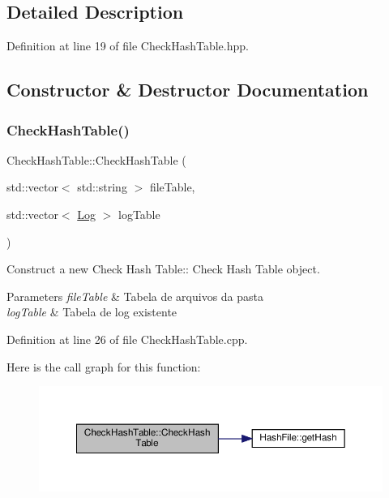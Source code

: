 \subsection{Detailed Description}


Definition at line 19 of file Check\+Hash\+Table.\+hpp.



\subsection{Constructor \& Destructor Documentation}
\mbox{\label{class_check_hash_table_a4e5be4b9a124cbf72c8f06d63e6ffca5}} 
\subsubsection{\texorpdfstring{Check\+Hash\+Table()}{CheckHashTable()}\hspace{0.1cm}{\footnotesize\ttfamily [1/2]}}
{\footnotesize\ttfamily Check\+Hash\+Table\+::\+Check\+Hash\+Table (\begin{DoxyParamCaption}\item[{std\+::vector$<$ std\+::string $>$}]{file\+Table,  }\item[{std\+::vector$<$ \hyperlink{class_log}{Log} $>$}]{log\+Table }\end{DoxyParamCaption})}



Construct a new Check Hash Table\+:\+: Check Hash Table object. 


\begin{DoxyParams}{Parameters}
{\em file\+Table} & Tabela de arquivos da pasta \\
\hline
{\em log\+Table} & Tabela de log existente \\
\hline
\end{DoxyParams}


Definition at line 26 of file Check\+Hash\+Table.\+cpp.

Here is the call graph for this function\+:
\nopagebreak
\begin{figure}[H]
\begin{center}
\leavevmode
\includegraphics[width=350pt]{dc/d2a/class_check_hash_table_a4e5be4b9a124cbf72c8f06d63e6ffca5_cgraph}
\end{center}
\end{figure}
\mbox{\label{class_check_hash_table_a64c43b1e671248aa466b3310471d3d96}} 

